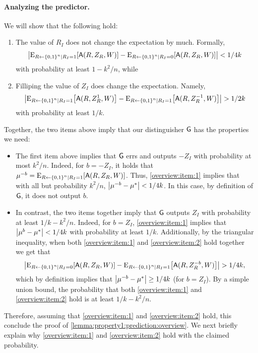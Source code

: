 \paragraph{Analyzing the predictor.} We will show that the following hold:
\begin{enumerate}
    \item\label{overview:item:1} The value of $R_I$ does not change the expectation by much. Formally,
$$ \size{\eex{R\gets \zn\mid R_I=1}{\Ac(R,Z_R, W)}-\eex{R\gets \zn\mid R_I=0}{\Ac(R,Z_R,W)}}<1/4k$$
with  probability at least $1-k^2/n$, while 
\item\label{overview:item:2} Filliping the value of $Z_I$ does change the expectation. Namely, $$\size{\eex{R\gets \zn\mid R_I=1}{\Ac(R,Z^1_R,W)}-\eex{R\gets \zn\mid R_I=1}{\Ac(R,Z^{-1}_R,W)}}> 1/2k$$
with probability at least $1/k$.
\end{enumerate}
Together, the two items above imply that our distinguisher $\mathsf{G}$ has the properties we need:
\begin{itemize}
    \item The first item  above implies that $\mathsf{G}$ errs and  outputs $-Z_I$  with probability at most $k^2/n$. Indeed, for $b=-Z_I$, it holds that $\mu^{-b}=\eex{R\gets \zn\mid R_I=1}{\Ac(R,Z_R, W)}$.  Thus, \cref{overview:item:1} implies that with all but probability $k^2/n$,  $\size{\mu^{-b}-\mu^{*}}<1/4k$. In this case, by definition of $\mathsf{G}$, it does not output $b$.
    
\item In contrast, the two items together imply that $\mathsf{G}$ outputs $Z_I$  with probability at least $1/k-k^2/n$. Indeed, for $b=Z_I$,  \cref{overview:item:1} implies that $\size{\mu^b-\mu^*}< 1/4k$ with probability at least $1/k$. Additionally, by the triangular inequality, when both \cref{overview:item:1} and \cref{overview:item:2} hold together we get  that 
$$ \size{\eex{R\gets \zn\mid R_I=0}{\Ac(R,Z_R,W)}-\eex{R\gets \zn\mid R_I=1}{\Ac(R,Z^{-b}_R,W)}}> 1/4k,$$
which by definition  implies that 
$\size{\mu^{-b}-\mu^{*}}\ge 1/4k$ (for $b=Z_I$). By a simple union bound, the probability that both \cref{overview:item:1} and \cref{overview:item:2} hold is at least $1/k - k^2/n$.
\end{itemize}
Therefore, assuming that \cref{overview:item:1} and \cref{overview:item:2} hold, this  conclude the proof of \cref{lemma:property1:prediction:overview}. We next briefly explain why \cref{overview:item:1} and \cref{overview:item:2} hold with the claimed probability.


